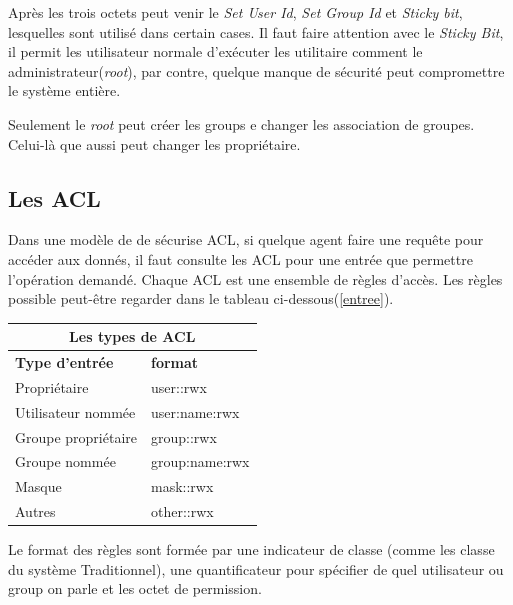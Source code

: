 Après les trois octets peut venir le \emph{Set User Id}, \emph{Set Group Id} et \emph{Sticky bit}, lesquelles sont utilisé dans certain cases. Il faut faire attention avec le \emph{Sticky Bit}, il permit les utilisateur normale d'exécuter les utilitaire comment le administrateur(\emph{root}), par contre, quelque manque de sécurité peut compromettre le système entière.

Seulement le \emph{root} peut créer les groups e changer les association de groupes. Celui-là que aussi peut changer les propriétaire. 

\subsection*{Les ACL}

Dans une modèle de de sécurise ACL, si quelque agent faire une requête pour accéder aux donnés, il faut consulte les ACL pour une entrée que permettre l'opération demandé. Chaque ACL est une ensemble de règles d'accès. Les règles possible peut-être regarder dans le tableau ci-dessous(\ref{entree}).
\begin{center}
\begin{tabular}{|l|l|}
  \hline
    \multicolumn{2}{|c|}{Les types de ACL} \\
  \hline
	\textbf{Type d'entrée} & \textbf{format} \\
  \hline
	Propriétaire & user::rwx \\
	Utilisateur nommée & user:name:rwx  \\
	Groupe propriétaire & group::rwx \\
	Groupe nommée & group:name:rwx \\
	Masque & mask::rwx \\
	Autres & other::rwx \\   
  \hline
\end{tabular}
\label{tab:entree}
\end{center}

Le format des règles sont formée par une indicateur de classe (comme les classe du système Traditionnel), une quantificateur pour spécifier de quel utilisateur ou group on parle et les octet de permission.

